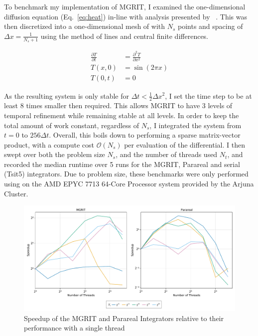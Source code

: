 \documentclass{article}
\begin{document}
To benchmark my implementation of MGRIT, I examined the one-dimensional diffusion equation (Eq.~\ref{eq:heat}) in-line with analysis presented by \citeauthor{friedhoffMULTIGRIDINTIMEALGORITHMSOLVING}~\cite{friedhoffMULTIGRIDINTIMEALGORITHMSOLVING}.
This was then discretized into a one-dimensional mesh of with \(N_s\) points and spacing of \( \Delta x = \frac{1}{N_s + 1} \) using the method of lines and central finite differences.

\begin{equation}\label{eq:heat}
    \begin{align*}
        \frac{\partial T}{\partial t} &= \frac{\partial^2 T}{\partial x^2} \\
        T(x, 0) &= \sin(2 \pi x) \\
        T(0, t) &= 0
    \end{align*}
\end{equation}

As the resulting system is only stable for \(\Delta t < \frac{1}{2} \Delta x^2\), I set the time step to be at least 8 times smaller then required.
This allows MGRIT to have 3 levels of temporal refinement while remaining stable at all levels.
In order to keep the total amount of work constant, regardless of \(N_s\), I integrated the system from \(t = 0\) to \(256 \Delta t\).
Overall, this boils down to performing a sparse matrix-vector product, with a compute cost \(\mathcal{O}(N_s) \) per evaluation of the differential.
I then swept over both the problem size \(N_s\), and the number of threads used \(N_t\), and recorded the median runtime over 5 runs for the MGRIT, Parareal and serial (Tsit5) integrators.
Due to problem size, these benchmarks were only performed using on the AMD EPYC 7713 64-Core Processor system provided by the Arjuna Cluster.

\begin{figure}[h!]
    \centering
    \includegraphics[width=\linewidth]{docs/assets/speedup_serial.pdf}
    \caption{Speedup of the MGRIT and Parareal Integrators relative to their performance with a single thread}
    \label{fig:heat_bench}
\end{figure}
\end{document}
